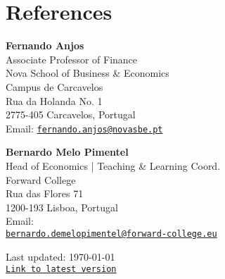 \documentclass[letterpaper]{article}
\def\footerlink{https://miguelcfoliveira.github.io/CV/CV.pdf}
\begin{document}
\section*{References}
\begin{multicols}{2}
\textbf{Fernando Anjos} \\
Associate Professor of Finance \\
Nova School of Business \& Economics \\
Campus de Carcavelos \\
Rua da Holanda No. 1 \\ 
2775-405 Carcavelos, Portugal \\ 
Email: \href{mailto:fernando.anjos@novasbe.pt}{\tt fernando.anjos@novasbe.pt} 
\columnbreak \hfill

\textbf{Bernardo Melo Pimentel} \\
Head of Economics | Teaching \& Learning Coord. \\
Forward College \\
Rua das Flores 71 \\
1200-193 Lisboa, Portugal \\
Email: \\ 
\href{mailto:bernardo.demelopimentel@forward-college.eu}{\tt bernardo.demelopimentel@forward-college.eu} 
\end{multicols}


\bigskip

\begin{center}
  \begin{footnotesize}
    Last updated: \today \\
    \href{\footerlink}{\texttt{Link to latest version}}
  \end{footnotesize}
\end{center}
\end{document}
